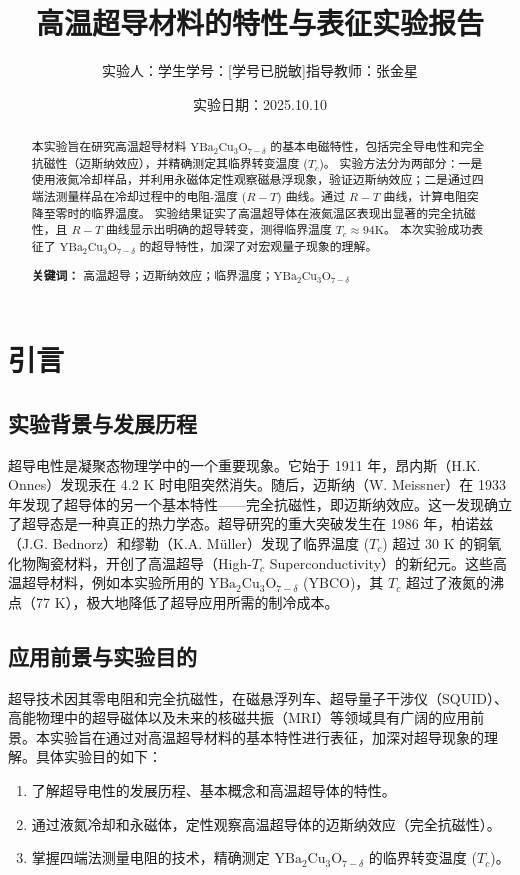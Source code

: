 \documentclass[a4paper, 1.5lines]{ctexart}
\title{高温超导材料的特性与表征实验报告}
\author{实验人：学生\qquad 学号：[学号已脱敏]\qquad 指导教师：张金星}
\date{实验日期：2025.10.10}
\begin{document}
    
    \maketitle
    
    \begin{abstract}
          本实验旨在研究高温超导材料 $\text{YBa}_2\text{Cu}_3\text{O}_{7-\delta}$ 的基本电磁特性，包括完全导电性和完全抗磁性（迈斯纳效应），并精确测定其临界转变温度 ($T_c$)。
          实验方法分为两部分：一是使用液氮冷却样品，并利用永磁体定性观察磁悬浮现象，验证迈斯纳效应；二是通过四端法测量样品在冷却过程中的电阻-温度 ($R-T$) 曲线。通过 $R-T$ 曲线，计算电阻突降至零时的临界温度。
          实验结果证实了高温超导体在液氮温区表现出显著的完全抗磁性，且 $R-T$ 曲线显示出明确的超导转变，测得临界温度 $T_c \approx 94\text{K}$。
          本次实验成功表征了 $\text{YBa}_2\text{Cu}_3\text{O}_{7-\delta}$ 的超导特性，加深了对宏观量子现象的理解。

          \textbf{关键词：} 高温超导；迈斯纳效应；临界温度；$\text{YBa}_2\text{Cu}_3\text{O}_{7-\delta}$
    \end{abstract}
    
    \section{引言}
        \label{sec:introduction}

        \subsection{实验背景与发展历程}
        超导电性是凝聚态物理学中的一个重要现象。它始于 1911 年，昂内斯（H.K. Onnes）发现汞在 4.2 K 时电阻突然消失。随后，迈斯纳（W. Meissner）在 1933 年发现了超导体的另一个基本特性——完全抗磁性，即迈斯纳效应。这一发现确立了超导态是一种真正的热力学态。超导研究的重大突破发生在 1986 年，柏诺兹（J.G. Bednorz）和缪勒（K.A. Müller）发现了临界温度 ($T_c$) 超过 30 K 的铜氧化物陶瓷材料，开创了高温超导（High-$T_c$ Superconductivity）的新纪元。这些高温超导材料，例如本实验所用的 $\text{YBa}_2\text{Cu}_3\text{O}_{7-\delta}$ (YBCO)，其 $T_c$ 超过了液氮的沸点（77 K），极大地降低了超导应用所需的制冷成本。

        \subsection{应用前景与实验目的}
        超导技术因其零电阻和完全抗磁性，在磁悬浮列车、超导量子干涉仪（SQUID）、高能物理中的超导磁体以及未来的核磁共振（MRI）等领域具有广阔的应用前景。本实验旨在通过对高温超导材料的基本特性进行表征，加深对超导现象的理解。具体实验目的如下：
        \begin{enumerate}
            \item 了解超导电性的发展历程、基本概念和高温超导体的特性。
            \item 通过液氮冷却和永磁体，定性观察高温超导体的迈斯纳效应（完全抗磁性）。
            \item 掌握四端法测量电阻的技术，精确测定 $\text{YBa}_2\text{Cu}_3\text{O}_{7-\delta}$ 的临界转变温度 ($T_c$)。
        \end{enumerate}
\end{document}
